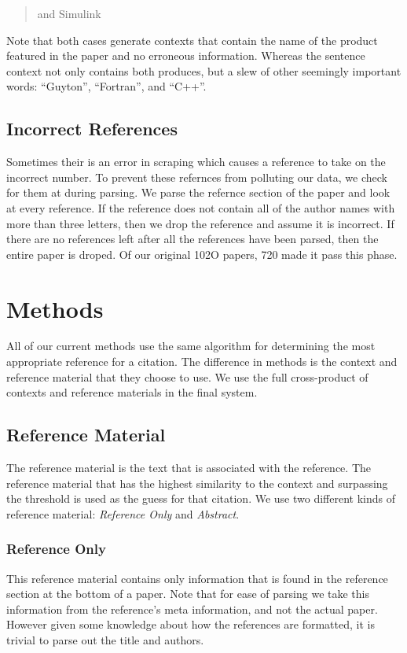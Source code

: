\documentclass[10pt, conference, compsocconf]{IEEEtran}
\begin{document}
\begin{quote}
and Simulink
\end{quote}

Note that both cases generate contexts that contain the name of the product featured in the paper and no erroneous information. Whereas the
sentence context not only contains both produces, but a slew of other seemingly important words: ``Guyton'', ``Fortran'', and ``C++''.

\subsection{Incorrect References}
Sometimes their is an error in scraping which causes a reference to take on the incorrect number.
To prevent these refernces from polluting our data, we check for them at during parsing.
We parse the refernce section of the paper and look at every reference. If the reference does not contain all of the author names with
more than three letters, then we drop the reference and assume it is incorrect.
If there are no references left after all the references have been parsed, then the entire paper is droped.
Of our original 102O papers, 720 made it pass this phase.

\section{Methods}\label{sec:methods}
All of our current methods use the same algorithm for determining the most appropriate reference for a citation.
The difference in methods is the context and reference material that they choose to use.
We use the full cross-product of contexts and reference materials in the final system.

\subsection{Reference Material}
The reference material is the text that is associated with the reference.
The reference material that has the highest similarity to the context and surpassing the threshold is
used as the guess for that citation.
We use two different kinds of reference material: \textit{Reference Only} and \textit{Abstract}.

\subsubsection{Reference Only}
This reference material contains only information that is found in the reference section at the bottom of a paper.
Note that for ease of parsing we take this information from the reference's meta information, and not the actual paper. However given
some knowledge about how the references are formatted, it is trivial to parse out the title and authors.
\end{document}
